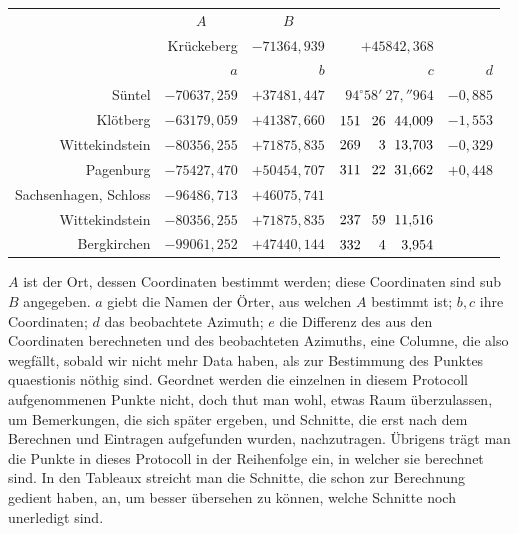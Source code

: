 \documentclass[12pt,a4paper]{article}
\theoremstyle{plain}
\theoremstyle{definition}
\theoremstyle{remark}
\begin{document}
\begin{center}
\begin{tabular}{r@{\quad}r@{\quad}r@{\quad}r@{\quad}r}
& \multicolumn{1}{c}{$A$} & \multicolumn{1}{c}{$B$} & & \\
& Krückeberg & \multicolumn{1}{r}{$-71364{,}939$} & $+45842{,}368$ & \\[2pt]
& $a$ & $b$ & $c$ & $d$ \\
Süntel & $-70637{,}259$ & $+37481{,}447$ & $94^{\circ} 58'\ 27{,}''964$ & $-0{,}885$ \\
Klötberg & $-63179{,}059$ & $+41387{,}660$ & $151\hphantom{^{\circ}}\ 26\hphantom{'}\ 44{,}009$ & $-1{,}553$ \\
Wittekindstein & $-80356{,}255$ & $+71875{,}835$ & $269\hphantom{^{\circ}}\ \hphantom{1}3\hphantom{'}\ 13{,}703$ & $-0{,}329$ \\
Pagenburg & $-75427{,}470$ & $+50454{,}707$ & $311\hphantom{^{\circ}}\ 22\hphantom{'}\ 31{,}662$ & $+0{,}448$ \\
\hline
Sachsenhagen, Schloss & $-96486{,}713$ & $+46075{,}741$ & & \\
Wittekindstein & $-80356{,}255$ & $+71875{,}835$ & $237\hphantom{^{\circ}}\ 59\hphantom{'}\ 11{,}516$ & \\
Bergkirchen & $-99061{,}252$ & $+47440{,}144$ & $332\hphantom{^{\circ}}\ \hphantom{1}4\hphantom{'}\ \hphantom{1}3{,}954$ & \\
\end{tabular}
\end{center}

$A$ ist der Ort, dessen Coordinaten bestimmt werden; diese Coordinaten sind sub $B$ angegeben. $a$ giebt die Namen der Örter, aus welchen $A$ bestimmt ist; $b, c$ ihre Coordinaten; $d$ das beobachtete Azimuth; $e$ die Differenz des aus den Coordinaten berechneten und des beobachteten Azimuths, eine Columne, die also wegfällt, sobald wir nicht mehr Data haben, als zur Bestimmung des Punktes quaestionis nöthig sind. Geordnet werden die einzelnen in diesem Protocoll aufgenommenen Punkte nicht, doch thut man wohl, etwas Raum überzulassen, um Bemerkungen, die sich später ergeben, und Schnitte, die erst nach dem Berechnen und Eintragen aufgefunden wurden, nachzutragen. Übrigens trägt man die Punkte in dieses Protocoll in der Reihenfolge ein, in welcher sie berechnet sind. In den Tableaux streicht man die Schnitte, die schon zur Berechnung gedient haben, an, um besser übersehen zu können, welche Schnitte noch unerledigt sind.
\end{document}
